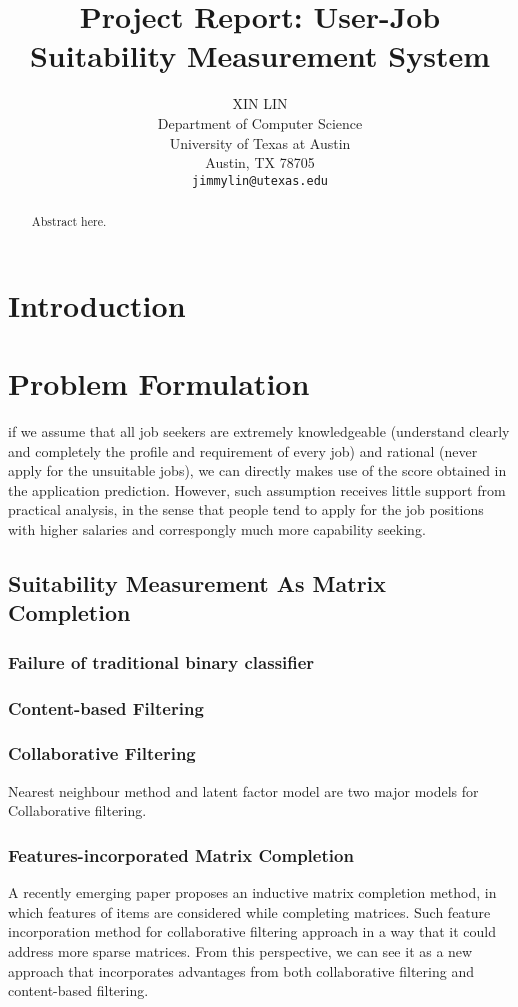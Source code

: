 \documentclass{article} %
\title{Project Report: User-Job Suitability Measurement System}
\author{
XIN LIN \\
Department of Computer Science\\
University of Texas at Austin \\
Austin, TX 78705 \\
\texttt{jimmylin@utexas.edu} \\
}
\begin{document}
\maketitle

\begin{abstract}
    Abstract here.
\end{abstract}

\section{Introduction}

\section{Problem Formulation}

if we assume that all job seekers are extremely knowledgeable (understand
clearly and completely the profile and requirement of every job) and rational
(never apply for the unsuitable jobs), we can directly makes use of the score
obtained in the application prediction. However, such assumption receives
little support from practical analysis, in the sense that people tend to apply
for the job positions with higher salaries and correspongly much more
capability seeking.

\subsection{Suitability Measurement As Matrix Completion}
\subsubsection{Failure of traditional binary classifier}

\subsubsection{Content-based Filtering}

\subsubsection{Collaborative Filtering}
Nearest neighbour method and latent factor model are two major models for
Collaborative filtering.
\subsubsection{Features-incorporated Matrix Completion}
A recently emerging paper proposes an inductive matrix completion method, in
which features of items are considered while completing matrices. Such feature
incorporation method for collaborative filtering approach in a way that
it could address more sparse matrices. From this perspective, we can see it as
a new approach that incorporates advantages from both collaborative filtering and
content-based filtering. 
\end{document}
